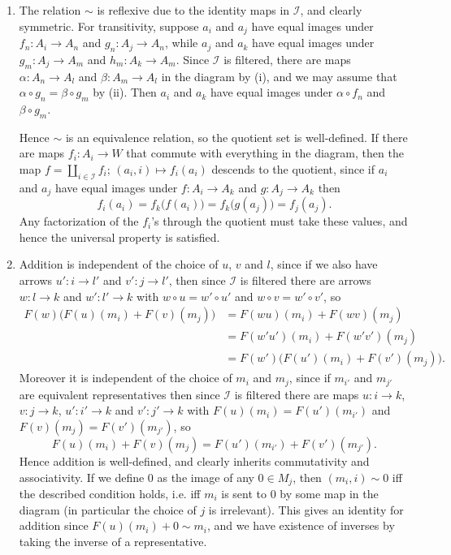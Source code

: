 \documentclass{report}
\newcommand{\I}{\mathscr{I}}
\begin{document}
\begin{enumerate}[label=\textbf{1.4.\Alph*.}]
	\item The relation $\sim$ is reflexive due to the identity maps in
	      $\I$, and clearly symmetric. For transitivity, suppose
	      $a_i$ and $a_j$ have equal images under $f_n:A_i\to A_n$ and
	      $g_n:A_j\to A_n$, while $a_j$ and $a_k$ have equal images under
	      $g_m:A_j\to A_m$ and $h_m:A_k\to A_m$. Since $\I$ is
	      filtered, there are maps $\alpha:A_n\to A_l$ and $\beta:A_m\to A_l$
	      in the diagram by (i), and we may assume that
	      $\alpha\circ g_n=\beta\circ g_m$ by (ii). Then $a_i$ and $a_k$ have
	      equal images under $\alpha\circ f_n$ and $\beta\circ g_m$.

	      Hence $\sim$ is an equivalence relation, so the quotient set is
	      well-defined. If there are maps $f_i:A_i\to W$ that commute with
	      everything in the diagram, then the map
	      $f=\amalg_{i\in\I}f_i$; $(a_i,i)\mapsto f_i(a_i)$ descends
	      to the quotient, since if $a_i$ and $a_j$ have equal images under
	      $f:A_i\to A_k$ and $g:A_j\to A_k$ then
	      \begin{equation*}
		      f_i(a_i) = f_k\bigl(f(a_i)\bigr) = f_k\bigl(g(a_j)\bigr) = f_j(a_j).
	      \end{equation*}
	      Any factorization of the $f_i$'s through the quotient must take
	      these values, and hence the universal property is satisfied.

	\item Addition is independent of the choice of $u$, $v$ and $l$, since
	      if we also have arrows $u':i\to l'$ and $v':j\to l'$, then since
	      $\I$ is filtered there are arrows $w:l\to k$ and
	      $w':l'\to k$ with $w\circ u=w'\circ u'$ and $w\circ v=w'\circ v'$,
	      so
	      \begin{align*}
		      F(w)\bigl(F(u)(m_i)+F(v)(m_j)\bigr)
		       & = F(wu)(m_i) + F(wv)(m_j)                 \\
		       & = F(w'u')(m_i) + F(w'v')(m_j)             \\
		       & = F(w')\bigl(F(u')(m_i)+F(v')(m_j)\bigr).
	      \end{align*}
	      Moreover it is independent of the choice of $m_i$ and $m_j$, since
	      if $m_{i'}$ and $m_{j'}$ are equivalent representatives then since
	      $\I$ is filtered there are maps $u:i\to k$, $v:j\to k$,
	      $u':i'\to k$ and $v':j'\to k$ with $F(u)(m_i)=F(u')(m_{i'})$ and
	      $F(v)(m_j)=F(v')(m_{j'})$, so
	      \begin{equation*}
		      F(u)(m_i) + F(v)(m_j) = F(u')(m_{i'}) + F(v')(m_{j'}).
	      \end{equation*}
	      Hence addition is well-defined, and clearly inherits commutativity
	      and associativity. If we define 0 as the image of any $0\in M_j$,
	      then $(m_i,i)\sim0$ iff the described condition holds, i.e. iff
	      $m_i$ is sent to 0 by some map in the diagram (in particular the
	      choice of $j$ is irrelevant). This gives an identity for addition
	      since $F(u)(m_i)+0\sim m_i$, and we have existence of inverses by
	      taking the inverse of a representative.


\end{enumerate}
\end{document}
